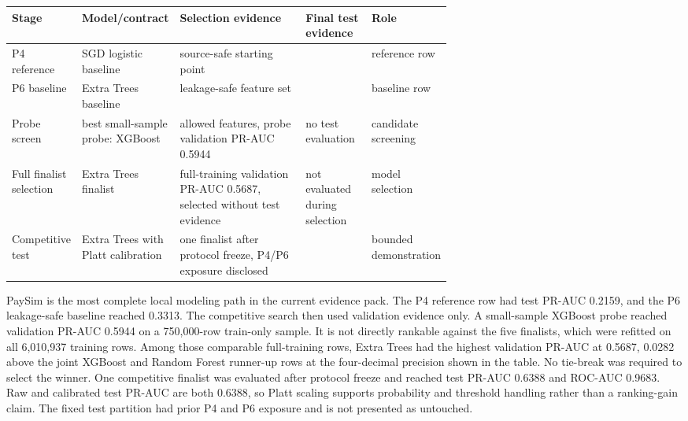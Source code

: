 \documentclass[11pt]{article}
\begin{document}
\begin{center}
\begin{minipage}{\linewidth}
\scriptsize
\setlength{\tabcolsep}{3pt}
\renewcommand{\arraystretch}{1.16}
\begin{tabularx}{\linewidth}{@{}>{\raggedright\arraybackslash}p{0.12\linewidth} >{\raggedright\arraybackslash}p{0.20\linewidth} >{\raggedright\arraybackslash}X >{\raggedright\arraybackslash}p{0.15\linewidth} >{\raggedright\arraybackslash}p{0.18\linewidth}@{}}
\toprule
Stage & Model/contract & Selection evidence & Final test evidence & Role \\
\midrule
P4 reference & SGD logistic baseline & source-safe starting point & 0.2159 & reference row \\
P6 baseline & Extra Trees baseline & leakage-safe feature set & 0.3313 & baseline row \\
Probe screen & best small-sample probe: XGBoost & 26 allowed features, probe validation PR-AUC 0.5944 & no test evaluation & candidate screening \\
Full finalist selection & Extra Trees finalist & full-training validation PR-AUC 0.5687, selected without test evidence & not evaluated during selection & model selection \\
Competitive test & Extra Trees with Platt calibration & one finalist after protocol freeze, P4/P6 exposure disclosed & 0.6388 & bounded demonstration \\
\bottomrule
\end{tabularx}
\end{minipage}
\end{center}


PaySim is the most complete local modeling path in the current evidence pack. The P4 reference row had test PR-AUC 0.2159, and the P6 leakage-safe baseline reached 0.3313. The competitive search then used validation evidence only. A small-sample XGBoost probe reached validation PR-AUC 0.5944 on a 750,000-row train-only sample. It is not directly rankable against the five finalists, which were refitted on all 6,010,937 training rows. Among those comparable full-training rows, Extra Trees had the highest validation PR-AUC at 0.5687, 0.0282 above the joint XGBoost and Random Forest runner-up rows at the four-decimal precision shown in the table. No tie-break was required to select the winner. One competitive finalist was evaluated after protocol freeze and reached test PR-AUC 0.6388 and ROC-AUC 0.9683. Raw and calibrated test PR-AUC are both 0.6388, so Platt scaling supports probability and threshold handling rather than a ranking-gain claim. The fixed test partition had prior P4 and P6 exposure and is not presented as untouched.
\end{document}
